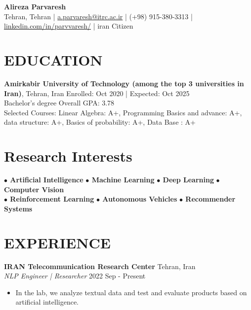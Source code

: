 \documentclass[a4paper,9pt]{extarticle}
\begin{document}
\pagestyle{empty}

\begin{center}
\textbf{\Large Alireza Parvaresh}\\[2pt] %
Tehran, Tehran | \href{mailto:example@example.com}{a.parvaresh@itrc.ac.ir} | (+98) 915-380-3313 | \href{https://www.linkedin.com/in/johndoe}{linkedin.com/in/parvvaresh/} | iran Citizen %
\end{center}

\section*{EDUCATION}
\noindent
\textbf{Amirkabir University of Technology (among the top 3 universities in Iran)}, Tehran, Iran \hfill Enrolled: Oct 2020 | Expected: Oct 2025\\ %
Bachelor's degree \hfill Overall GPA: 3.78\\ %
Selected Courses: Linear  Algebra: A+, Programming Basics and advance: A+,  data structure: A+, Basics of probability: A+, Data Base : A+ \hfill

\section{Research Interests}


\textbf{ $\bullet$ Artificial Intelligence}\hspace*{16pt}
\textbf{ $\bullet$ Machine Learning} \hspace*{16pt}
\textbf{ $\bullet$ Deep Learning}\hspace*{16pt}
\textbf{ $\bullet$ Computer Vision}\hspace*{16pt}\\
\textbf{ $\bullet$ Reinforcement Learning}\hspace*{16pt}
\textbf{ $\bullet$ Autonomous Vehicles}	\hspace*{16pt}	
\textbf{ $\bullet$ Recommender Systems}\hspace*{16pt}

\section*{EXPERIENCE}
\noindent
\textbf{IRAN Telecommunication Research Center} \hfill Tehran, Iran\\ %
\textit{NLP Engineer | Researcher} \hfill 2022 Sep - Present %
\begin{itemize}
    \item In the lab, we analyze textual data and test and evaluate products based on artificial intelligence. %
\end{itemize}
\end{document}
